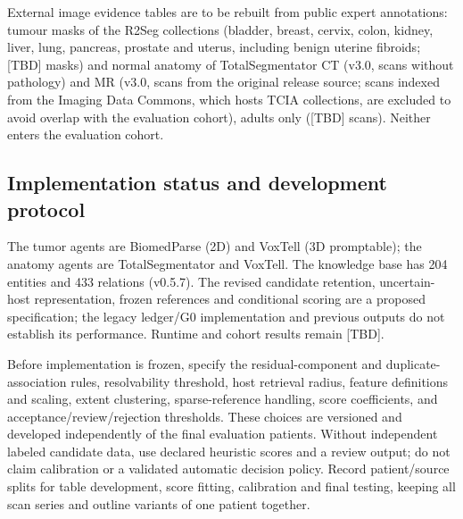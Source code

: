 \documentclass[fleqn,10pt]{olplainarticle}
\begin{document}
External image evidence tables are to be rebuilt from public expert annotations: tumour masks of the R2Seg collections
(bladder, breast, cervix, colon, kidney, liver, lung, pancreas, prostate and uterus, including benign uterine fibroids;
[TBD] masks) and normal anatomy of
TotalSegmentator CT (v3.0, scans without pathology) and MR (v3.0, scans from the original release source; scans indexed from the
Imaging Data Commons, which hosts TCIA collections, are excluded to avoid overlap with the evaluation cohort), adults only ([TBD] scans). Neither enters the evaluation cohort.

\subsection{Implementation status and development protocol}
The tumor agents are BiomedParse (2D) and VoxTell (3D promptable); the anatomy agents are TotalSegmentator and VoxTell. The
knowledge base has 204 entities and 433 relations (v0.5.7). The revised candidate retention, uncertain-host representation,
frozen references and conditional scoring are a proposed specification; the legacy ledger/G0 implementation and previous
outputs do not establish its performance. Runtime and cohort results remain [TBD].

Before implementation is frozen, specify the residual-component and duplicate-association rules, resolvability threshold,
host retrieval radius, feature definitions and scaling, extent clustering, sparse-reference handling, score coefficients,
and acceptance/review/rejection thresholds. These choices are versioned and developed independently of the final evaluation
patients. Without independent labeled candidate data, use declared heuristic scores and a review output; do not claim
calibration or a validated automatic decision policy. Record patient/source splits for table development, score fitting,
calibration and final testing, keeping all scan series and outline variants of one patient together.
\end{document}
